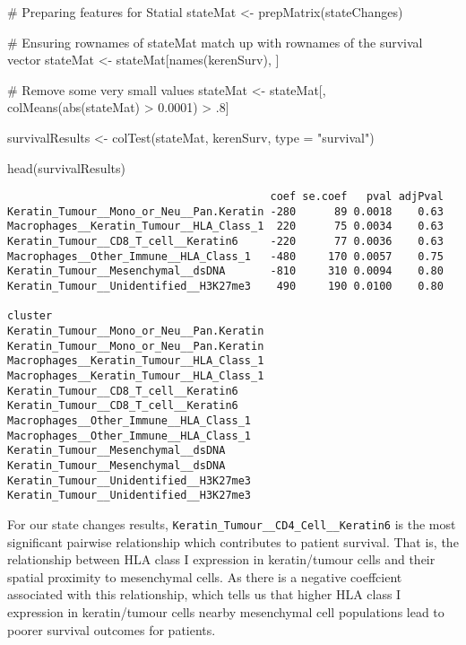 \documentclass[
  letterpaper,
  DIV=11,
  numbers=noendperiod]{scrreprt}
\newenvironment{Shaded}{\begin{snugshade}}{\end{snugshade}}
\newcommand{\AttributeTok}[1]{\textcolor[rgb]{0.40,0.45,0.13}{#1}}
\newcommand{\CommentTok}[1]{\textcolor[rgb]{0.37,0.37,0.37}{#1}}
\newcommand{\DecValTok}[1]{\textcolor[rgb]{0.68,0.00,0.00}{#1}}
\newcommand{\FloatTok}[1]{\textcolor[rgb]{0.68,0.00,0.00}{#1}}
\newcommand{\FunctionTok}[1]{\textcolor[rgb]{0.28,0.35,0.67}{#1}}
\newcommand{\NormalTok}[1]{\textcolor[rgb]{0.00,0.23,0.31}{#1}}
\newcommand{\OtherTok}[1]{\textcolor[rgb]{0.00,0.23,0.31}{#1}}
\newcommand{\SpecialCharTok}[1]{\textcolor[rgb]{0.37,0.37,0.37}{#1}}
\newcommand{\StringTok}[1]{\textcolor[rgb]{0.13,0.47,0.30}{#1}}
\begin{document}
\begin{Shaded}
\begin{Highlighting}[]
\CommentTok{\# Preparing features for Statial}
\NormalTok{stateMat }\OtherTok{\textless{}{-}} \FunctionTok{prepMatrix}\NormalTok{(stateChanges)}

\CommentTok{\# Ensuring rownames of stateMat match up with rownames of the survival vector}
\NormalTok{stateMat }\OtherTok{\textless{}{-}}\NormalTok{ stateMat[}\FunctionTok{names}\NormalTok{(kerenSurv), ]}

\CommentTok{\# Remove some very small values}
\NormalTok{stateMat }\OtherTok{\textless{}{-}}\NormalTok{ stateMat[, }\FunctionTok{colMeans}\NormalTok{(}\FunctionTok{abs}\NormalTok{(stateMat) }\SpecialCharTok{\textgreater{}} \FloatTok{0.0001}\NormalTok{) }\SpecialCharTok{\textgreater{}}\NormalTok{ .}\DecValTok{8}\NormalTok{]}

\NormalTok{survivalResults }\OtherTok{\textless{}{-}} \FunctionTok{colTest}\NormalTok{(stateMat, kerenSurv, }\AttributeTok{type =} \StringTok{"survival"}\NormalTok{)}

\FunctionTok{head}\NormalTok{(survivalResults)}
\end{Highlighting}
\end{Shaded}

\begin{verbatim}
                                         coef se.coef   pval adjPval
Keratin_Tumour__Mono_or_Neu__Pan.Keratin -280      89 0.0018    0.63
Macrophages__Keratin_Tumour__HLA_Class_1  220      75 0.0034    0.63
Keratin_Tumour__CD8_T_cell__Keratin6     -220      77 0.0036    0.63
Macrophages__Other_Immune__HLA_Class_1   -480     170 0.0057    0.75
Keratin_Tumour__Mesenchymal__dsDNA       -810     310 0.0094    0.80
Keratin_Tumour__Unidentified__H3K27me3    490     190 0.0100    0.80
                                                                          cluster
Keratin_Tumour__Mono_or_Neu__Pan.Keratin Keratin_Tumour__Mono_or_Neu__Pan.Keratin
Macrophages__Keratin_Tumour__HLA_Class_1 Macrophages__Keratin_Tumour__HLA_Class_1
Keratin_Tumour__CD8_T_cell__Keratin6         Keratin_Tumour__CD8_T_cell__Keratin6
Macrophages__Other_Immune__HLA_Class_1     Macrophages__Other_Immune__HLA_Class_1
Keratin_Tumour__Mesenchymal__dsDNA             Keratin_Tumour__Mesenchymal__dsDNA
Keratin_Tumour__Unidentified__H3K27me3     Keratin_Tumour__Unidentified__H3K27me3
\end{verbatim}

For our state changes results,
\texttt{Keratin\_Tumour\_\_CD4\_Cell\_\_Keratin6} is the most
significant pairwise relationship which contributes to patient survival.
That is, the relationship between HLA class I expression in
keratin/tumour cells and their spatial proximity to mesenchymal cells.
As there is a negative coeffcient associated with this relationship,
which tells us that higher HLA class I expression in keratin/tumour
cells nearby mesenchymal cell populations lead to poorer survival
outcomes for patients.
\end{document}
